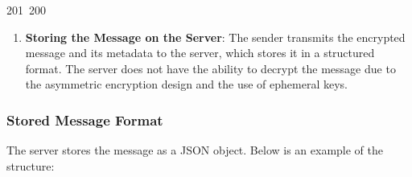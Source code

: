 201~200~\documentclass{article}
\begin{document}
\begin{enumerate}
	                                                                                                                                                                                                                                                                                                \item \textbf{Storing the Message on the Server}: The sender transmits the encrypted message and its metadata to the server, which stores it in a structured format. The server does not have the ability to decrypt the message due to the asymmetric encryption design and the use of ephemeral keys.
	                                                                                                                                                                                                                                                                                                \end{enumerate}

	                                                                                                                                                                                                                                                                                                \subsubsection{Stored Message Format}

	                                                                                                                                                                                                                                                                                                The server stores the message as a JSON object. Below is an example of the structure:
\end{document}
